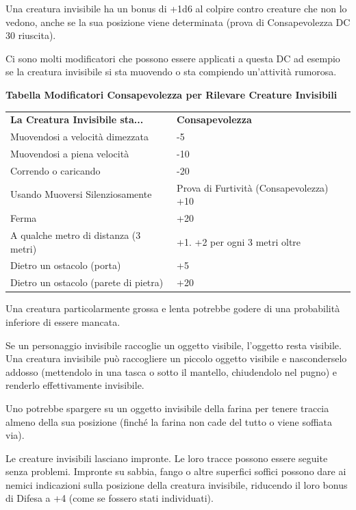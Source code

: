 \documentclass[a4paper,11pt,twoside,openany]{book}
\begin{document}
Una creatura invisibile ha un bonus di +1d6 al colpire contro creature che non lo vedono, anche se la sua posizione viene determinata (prova di Consapevolezza DC 30 riuscita).

Ci sono molti modificatori che possono essere applicati a questa DC ad esempio se la creatura invisibile si sta muovendo o sta compiendo un'attività rumorosa.

\bigskip

\textbf{Tabella Modificatori Consapevolezza per Rilevare Creature Invisibili}

\medskip

\begin{tabular}{ll}
	\toprule
	\textbf{La Creatura Invisibile sta...} & \textbf{Consapevolezza}\\
	Muovendosi a velocità dimezzata        & -5\\
	Muovendosi a piena velocità            & -10\\
	Correndo o caricando                   & -20\\
	Usando Muoversi Silenziosamente        & Prova di Furtività (Consapevolezza) +10\\
	Ferma                                  & +20\\
	A qualche metro di distanza (3 metri)  & +1. +2 per ogni 3 metri oltre\\
	Dietro un ostacolo (porta)             & +5\\
	Dietro un ostacolo (parete di pietra)  & +20\\
\end{tabular}

\bigskip

Una creatura particolarmente grossa e lenta potrebbe godere di una probabilità inferiore di essere mancata.

Se un personaggio invisibile raccoglie un oggetto visibile, l'oggetto resta visibile. Una creatura invisibile può raccogliere un piccolo oggetto visibile e nasconderselo addosso (mettendolo in una tasca o sotto il mantello, chiudendolo nel pugno) e renderlo effettivamente invisibile.

Uno potrebbe spargere su un oggetto invisibile della farina per tenere traccia almeno della sua posizione (finché la farina non cade del tutto o viene soffiata via).

Le creature invisibili lasciano impronte. Le loro tracce possono essere seguite senza problemi. Impronte su sabbia, fango o altre superfici soffici possono dare ai nemici indicazioni sulla posizione della creatura invisibile, riducendo il loro bonus di Difesa a +4 (come se fossero stati individuati).
\end{document}
